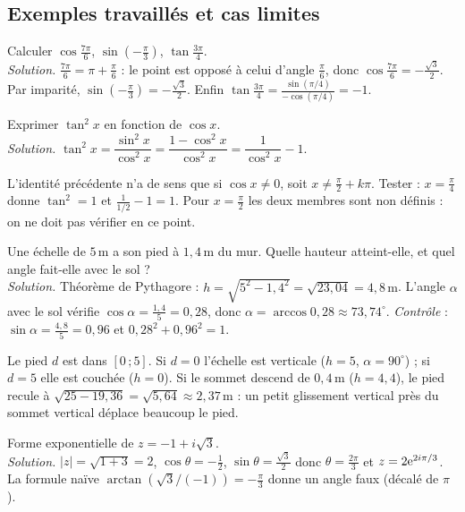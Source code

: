 \subsection{Exemples travaillés et cas limites}
\begin{exemple}
Calculer $\cos\frac{7\pi}6$, $\sin(-\frac\pi3)$, $\tan\frac{3\pi}4$.\\
\emph{Solution.} $\frac{7\pi}6=\pi+\frac\pi6$ : le point est opposé à celui d'angle $\frac\pi6$, donc $\cos\frac{7\pi}6=-\frac{\sqrt3}2$. Par imparité, $\sin(-\frac\pi3)=-\frac{\sqrt3}2$. Enfin $\tan\frac{3\pi}4=\frac{\sin(\pi/4)}{-\cos(\pi/4)}=-1$.
\end{exemple}
\begin{exemple}
Exprimer $\tan^2x$ en fonction de $\cos x$.\\
\emph{Solution.} $\tan^2x=\dfrac{\sin^2x}{\cos^2x}=\dfrac{1-\cos^2x}{\cos^2x}=\dfrac1{\cos^2x}-1$.
\end{exemple}
\begin{cas}
L'identité précédente n'a de sens que si $\cos x\ne0$, soit $x\ne\frac\pi2+k\pi$. Tester : $x=\frac\pi4$ donne $\tan^2=1$ et $\frac1{1/2}-1=1$. Pour $x=\frac\pi2$ les deux membres sont non définis : on ne doit pas \og vérifier \fg{} en ce point.
\end{cas}
\begin{exemple}
Une échelle de $5\,\mathrm m$ a son pied à $1{,}4\,\mathrm m$ du mur. Quelle hauteur atteint-elle, et quel angle fait-elle avec le sol ?\\
\emph{Solution.} Théorème de Pythagore : $h=\sqrt{5^2-1{,}4^2}=\sqrt{23{,}04}=4{,}8\,\mathrm m$. L'angle $\alpha$ avec le sol vérifie $\cos\alpha=\frac{1{,}4}5=0{,}28$, donc $\alpha=\arccos0{,}28\approx73{,}74^\circ$. \emph{Contrôle} : $\sin\alpha=\frac{4{,}8}5=0{,}96$ et $0{,}28^2+0{,}96^2=1$.
\end{exemple}
\begin{cas}
Le pied $d$ est dans $[0\,;5]$. Si $d=0$ l'échelle est verticale ($h=5$, $\alpha=90^\circ$) ; si $d=5$ elle est couchée ($h=0$). Si le sommet descend de $0{,}4\,\mathrm m$ ($h=4{,}4$), le pied recule à $\sqrt{25-19{,}36}=\sqrt{5{,}64}\approx2{,}37\,\mathrm m$ : un petit glissement vertical près du sommet vertical déplace beaucoup le pied.
\end{cas}
\begin{exemple}
Forme exponentielle de $z=-1+i\sqrt3$.\\
\emph{Solution.} $|z|=\sqrt{1+3}=2$, $\cos\theta=-\frac12$, $\sin\theta=\frac{\sqrt3}2$ donc $\theta=\frac{2\pi}3$ et $z=2\mathrm{e}^{2i\pi/3}$. La formule naïve $\arctan(\sqrt3/(-1))=-\frac\pi3$ donne un angle faux (décalé de $\pi$).
\end{exemple}
